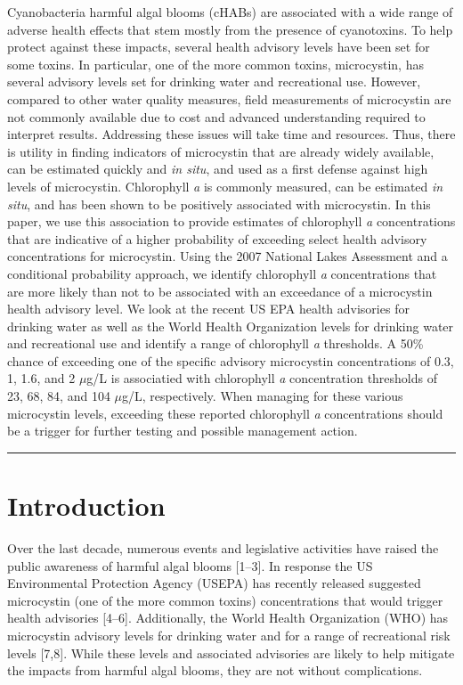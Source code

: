 \documentclass[11pt,]{article}
\begin{document}
Cyanobacteria harmful algal blooms (cHABs) are associated with a wide
range of adverse health effects that stem mostly from the presence of
cyanotoxins. To help protect against these impacts, several health
advisory levels have been set for some toxins. In particular, one of the
more common toxins, microcystin, has several advisory levels set for
drinking water and recreational use. However, compared to other water
quality measures, field measurements of microcystin are not commonly
available due to cost and advanced understanding required to interpret
results. Addressing these issues will take time and resources. Thus,
there is utility in finding indicators of microcystin that are already
widely available, can be estimated quickly and \emph{in situ}, and used
as a first defense against high levels of microcystin. Chlorophyll
\emph{a} is commonly measured, can be estimated \emph{in situ}, and has
been shown to be positively associated with microcystin. In this paper,
we use this association to provide estimates of chlorophyll \emph{a}
concentrations that are indicative of a higher probability of exceeding
select health advisory concentrations for microcystin. Using the 2007
National Lakes Assessment and a conditional probability approach, we
identify chlorophyll \emph{a} concentrations that are more likely than
not to be associated with an exceedance of a microcystin health advisory
level. We look at the recent US EPA health advisories for drinking water
as well as the World Health Organization levels for drinking water and
recreational use and identify a range of chlorophyll \emph{a}
thresholds. A 50\% chance of exceeding one of the specific advisory
microcystin concentrations of 0.3, 1, 1.6, and 2 \(\mu\)g/L is
associatied with chlorophyll \emph{a} concentration thresholds of 23,
68, 84, and 104 \(\mu\)g/L, respectively. When managing for these
various microcystin levels, exceeding these reported chlorophyll
\emph{a} concentrations should be a trigger for further testing and
possible management action.

\vspace{3mm}

\hrule

\doublespace

\section{Introduction}\label{introduction}

Over the last decade, numerous events and legislative activities have
raised the public awareness of harmful algal blooms {[}1--3{]}. In
response the US Environmental Protection Agency (USEPA) has recently
released suggested microcystin (one of the more common toxins)
concentrations that would trigger health advisories {[}4--6{]}.
Additionally, the World Health Organization (WHO) has microcystin
advisory levels for drinking water and for a range of recreational risk
levels {[}7,8{]}. While these levels and associated advisories are
likely to help mitigate the impacts from harmful algal blooms, they are
not without complications.
\end{document}

